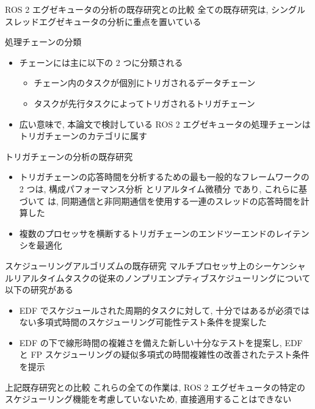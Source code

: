 \begin{frame}{ROS 2 エグゼキュータの分析の既存研究との比較}
    全ての既存研究は, シングルスレッドエグゼキュータの分析に重点を置いている
\end{frame}


\begin{frame}{処理チェーンの分類}
    \begin{itemize}
        \item チェーンには主に以下の 2 つに分類される
              \begin{itemize}
                  \item チェーン内のタスクが個別にトリガされるデータチェーン
                  \item タスクが先行タスクによってトリガされるトリガチェーン
              \end{itemize}
        \item 広い意味で, 本論文で検討している ROS 2 エグゼキュータの処理チェーンはトリガチェーンのカテゴリに属す
    \end{itemize}
\end{frame}

\begin{frame}{トリガチェーンの分析の既存研究}
    \begin{itemize}
        \item トリガチェーンの応答時間を分析するための最も一般的なフレームワークの 2 つは, 構成パフォーマンス分析 \cite{henia2005system} とリアルタイム微積分 \cite{chakraborty2003general} であり, これらに基づいて \cite{schlatow2016response} は, 同期通信と非同期通信を使用する一連のスレッドの応答時間を計算した
        \item 複数のプロセッサを横断するトリガチェーンのエンドツーエンドのレイテンシを最適化 \cite{schliecker2009recursive}
    \end{itemize}
\end{frame}

\begin{frame}{スケジューリングアルゴリズムの既存研究}
    マルチプロセッサ上のシーケンシャルリアルタイムタスクの従来のノンプリエンプティブスケジューリングについて以下の研究がある
    \begin{itemize}
        \item EDF でスケジュールされた周期的タスクに対して, 十分ではあるが必須ではない多項式時間のスケジューリング可能性テスト条件を提案した \cite{baruah2006non}
        \item EDF の下で線形時間の複雑さを備えた新しい十分なテストを提案し, EDF と FP スケジューリングの疑似多項式の時間複雑性の改善されたテスト条件を提示 \cite{guan2008new}
    \end{itemize}
\end{frame}

\begin{frame}{上記既存研究との比較}
    これらの全ての作業は, ROS 2 エグゼキュータの特定のスケジューリング機能を考慮していないため, 直接適用することはできない
\end{frame}
